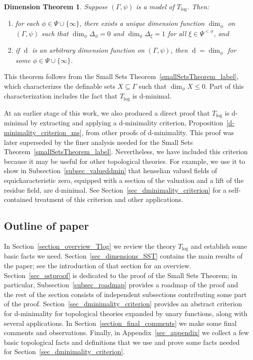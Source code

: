 \documentclass[11pt]{amsart}
\theoremstyle{plain}
\newtheorem{dimensionTheorem}[thm]{Dimension Theorem}
\theoremstyle{definition}
\numberwithin{equation}{section}
\newcommand\0{\varnothing}
\begin{document}
\begin{dimensionTheorem}\label{dimensionTheorem_label}
Suppose $(\Gamma,\psi)$ is a model of $T_{\log}$. Then:
\begin{enumerate}
\item for each $\phi\in\Psi\cup\{\infty\}$, there exists a unique dimension function $\dim_{\phi}$ on $(\Gamma,\psi)$ such that $\dim_{\phi}\Delta_{\phi}=0$ and $\dim_{\phi}\Delta_{\xi}=1$ for all $\xi\in\Psi^{<\phi}$, and
\item if $\operatorname{d}$ is an arbitrary dimension function on $(\Gamma,\psi)$, then $\operatorname{d}=\dim_{\phi}$ for some $\phi\in\Psi \cup\{\infty\}$.
\end{enumerate}
\end{dimensionTheorem}

\noindent
This theorem follows from the Small Sets Theorem~\ref{smallSetsTheorem_label}, which characterizes the definable sets $X\subseteq\Gamma$ such that $\dim_{\phi}X\leq 0$. Part of this characterization includes the fact that $T_{\log}$ is d-minimal.

\medskip\noindent
At an earlier stage of this work, we also produced a direct proof that $T_{\log}$ is d-minimal by extracting and applying a d-minimality criterion, Proposition~\ref{d-minimality_criterion_ms}, from other proofs of d-minimality. This proof was later superseded by the finer analysis needed for the Small Sets Theorem~\ref{smallSetsTheorem_label}. Nevertheless, we have included this criterion because it may be useful for other topological theories. For example, we use it to show in Subsection~\ref{subsec_valueddmin} that henselian valued fields of equicharacteristic zero, equipped with a section of the valuation and a lift of the residue field, are d-minimal. See Section~\ref{sec_dminimality_criterion} for a self-contained treatment of this criterion and other applications.

\subsection{Outline of paper}
In Section~\ref{section_overview_Tlog} we review the theory $T_{\log}$ and establish some basic facts we need.
Section~\ref{sec_dimensions_SST} contains the main results of the paper; see the introduction of that section for an overview.
Section~\ref{sec_sstproof} is dedicated to the proof of the Small Sets Theorem;
in particular, Subsection~\ref{subsec_roadmap} provides a roadmap of the proof and the rest of the section consists of independent subsections contributing some part of the proof.
Section~\ref{sec_dminimality_criterion} provides an abstract criterion for d-minimality for topological theories expanded by unary functions, along with several applications.
In Section~\ref{section_final_comments} we make some final comments and observations.
Finally, in Appendix~\ref{sec_appendix} we collect a few basic topological facts and definitions that we use and prove some facts needed for Section~\ref{sec_dminimality_criterion}.
\end{document}
